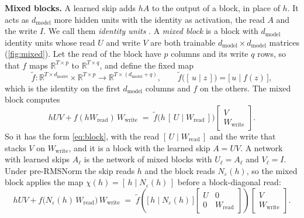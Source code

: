 \documentclass[10pt]{article}
\theoremstyle{definition}
\theoremstyle{remark}
\newcommand{\R}{\mathbb{R}}
\newcommand{\Wread}{W_{\mathrm{read}}}
\newcommand{\Wwrite}{W_{\mathrm{write}}}
\newcommand{\dm}{d_{\mathrm{model}}}
\newcommand{\para}[1]{\smallskip\noindent\textbf{#1}\hspace{0.5em}}
\begin{document}
\para{Mixed blocks.} A learned skip adds $hA$ to the output of a block, in place of $h$. It acts as $\dm$ more hidden units with the identity as activation, the read $A$ and the write $I$. We call them \emph{identity units} \citep[Section~4]{lin2018resnet}. A \emph{mixed block} is a block with $\dm$ identity units whose read $U$ and write $V$ are both trainable $\dm\times\dm$ matrices (\cref{fig:mixed}). Let the read of the block have $p$ columns and its write $q$ rows, so that $f$ maps $\R^{T\times p}$ to $\R^{T\times q}$, and define the fixed map
\[
\tilde f : \R^{T\times\dm} \times \R^{T\times p} \to \R^{T\times(\dm+q)}, \qquad \tilde f\big([\,u \mid z\,]\big) = \big[\,u \mid f(z)\,\big],
\]
which is the identity on the first $\dm$ columns and $f$ on the others. The mixed block computes
\begin{equation}\label{eq:mixed}
hUV + f(h\Wread)\,\Wwrite \;=\; \tilde f\big(h\,[\,U \mid \Wread\,]\big)\begin{bmatrix} V \\ \Wwrite \end{bmatrix}.
\end{equation}
So it has the form \eqref{eq:block}, with the read $[\,U \mid \Wread\,]$ and the write that stacks $V$ on $\Wwrite$, and it is a block with the learned skip $A = UV$. A network with learned skips $A_\ell$ is the network of mixed blocks with $U_\ell = A_\ell$ and $V_\ell = I$. Under pre-RMSNorm the skip reads $h$ and the block reads $N_\varepsilon(h)$, so the mixed block applies the map $\chi(h) = [\,h \mid N_\varepsilon(h)\,]$ before a block-diagonal read:
\begin{equation}\label{eq:prenormblock}
hUV + f\big(N_\varepsilon(h)\,\Wread\big)\,\Wwrite \;=\; \tilde f\left(\big[\,h \mid N_\varepsilon(h)\,\big]\begin{bmatrix} U & 0 \\ 0 & \Wread \end{bmatrix}\right)\begin{bmatrix} V \\ \Wwrite \end{bmatrix}.
\end{equation}
\end{document}
